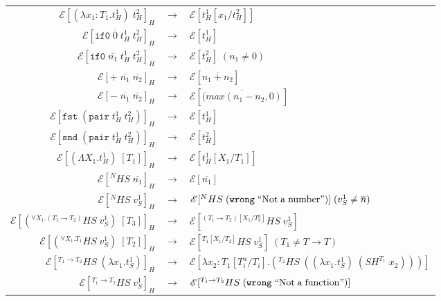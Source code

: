 \begin{figure}
\onehalfspacing
\begin{center}
\begin{tabular}{rcl}
$\mathscr{E}[(\lambda x_{1}:T_{1}.t_{H}^{1})\;t_{H}^{2}]_{H}$ & $\rightarrow$ & $\mathscr{E}[t_{H}^{1}[x_{1}/t_{H}^{2}]]$ \\
$\mathscr{E}[\mathtt{if0}\;\overline{0}\;t_{H}^{1}\;t_{H}^{2}]_{H}$ & $\rightarrow$ & $\mathscr{E}[t_{H}^{1}]$ \\
$\mathscr{E}[\mathtt{if0}\;\overline{n_{1}}\;t_{H}^{1}\;t_{H}^{2}]_{H}$ & $\rightarrow$ & $\mathscr{E}[t_{H}^{2}]\;(n_{1}\neq0)$ \\
$\mathscr{E}[+\;\overline{n_{1}}\;\overline{n_{2}}]_{H}$ & $\rightarrow$ & $\mathscr{E}[\overline{n_{1}+n_{2}}]$ \\
$\mathscr{E}[-\;\overline{n_{1}}\;\overline{n_{2}}]_{H}$ & $\rightarrow$ & $\mathscr{E}[\overline{(max(n_{1}-n_{2},0)}]$ \\
$\mathscr{E}[\mathtt{fst}\;(\mathtt{pair}\;t_{H}^{1}\;t_{H}^{2})]_{H}$ & $\rightarrow$ & $\mathscr{E}[t_{H}^{1}]$ \\
$\mathscr{E}[\mathtt{snd}\;(\mathtt{pair}\;t_{H}^{1}\;t_{H}^{2})]_{H}$ & $\rightarrow$ & $\mathscr{E}[t_{H}^{2}]$ \\
$\mathscr{E}[(\Lambda X_{1}.t_{H}^{1})\;[T_{1}]]_{H}$ & $\rightarrow$ & $\mathscr{E}[t_{H}^{1}[X_{1}/T_{1}]]$ \\
$\mathscr{E}[^{N}HS\;\overline{n_{1}}]_{H}$ & $\rightarrow$ & $\mathscr{E}[\overline{n_{1}}]$ \\
$\mathscr{E}[^{N}HS\;v_{S}^{1}]_{H}$ & $\rightarrow$ & $\mathscr{E}[^{N}HS\;(\mathtt{wrong}\;\mathrm{``Not\;a\;number"})]\;(v_{S}^{1}\neq\overline{n})$ \\
$\mathscr{E}[(^{\forall X_{1}.(T_{1}\rightarrow T_{2})}HS\;v_{S}^{1})\;[T_{3}]]_{H}$ & $\rightarrow$ & $\mathscr{E}[^{(T_{1}\rightarrow T_{2})[X_{1}/T^{a}_{3}]}HS\;v_{S}^{1}]$ \\
$\mathscr{E}[(^{\forall X_{1}.T_{1}}HS\;v_{S}^{1})\;[T_{2}]]_{H}$ & $\rightarrow$ & $\mathscr{E}[^{T_{1}[X_{1}/T_{2}]}HS\;v_{S}^{1}]\;(T_{1}\neq T\rightarrow T)$ \\
$\mathscr{E}[^{T_{1}\rightarrow T_{2}}HS\;(\lambda x_{1}.t_{S}^{1})]_{H}$ & $\rightarrow$ & $\mathscr{E}[\lambda x_{2}:T_{1}[T^{a}_{i}/T_{i}].(^{T_{2}}HS\;((\lambda x_{1}.t_{S}^{1})\;(SH^{T_{1}}\;x_{2})))]$ \\
$\mathscr{E}[^{T_{1}\rightarrow T_{2}}HS\;v_{S}^{1}]_{H}$ & $\rightarrow$ & $\mathscr{E}[^{T_{1}\rightarrow T_{2}}HS\;(\mathtt{wrong}\;\mathrm{``Not\;a\;function"})]$ \\

\end{tabular}
\end{center}
\end{figure}

